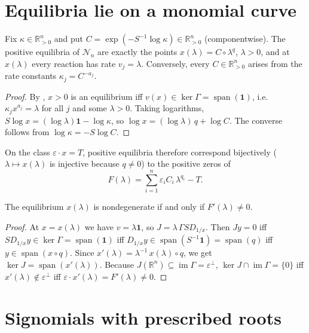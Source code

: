 \documentclass[11pt,a4paper]{report}
\newcommand{\Net}{\mathcal N}
\newcommand{\one}{\mathbf 1}
\providecommand{\im}{\operatorname{im}}
\providecommand{\spn}{\operatorname{span}}
\begin{document}
\section{Equilibria lie on a monomial curve}

\begin{lemma}\label{lem:curve}
Fix \(\kappa\in\mathbb R^n_{>0}\) and put \(C=\exp(-S^{-1}\log\kappa)\in\mathbb R^n_{>0}\) (componentwise). The positive
equilibria of \(\Net_n\) are exactly the points \(x(\lambda)=C\circ\lambda^{q}\), \(\lambda>0\), and at \(x(\lambda)\)
every reaction has rate \(v_j=\lambda\). Conversely, every \(C\in\mathbb R^n_{>0}\) arises from the rate constants
\(\kappa_j=C^{-a_j}\).
\end{lemma}

\begin{proof}
By , \(x>0\) is an equilibrium iff \(v(x)\in\ker\Gamma=\spn(\one)\), i.e.\
\(\kappa_jx^{a_j}=\lambda\) for all \(j\) and some \(\lambda>0\). Taking logarithms,
\(S\log x=(\log\lambda)\one-\log\kappa\), so \(\log x=(\log\lambda)\,q+\log C\). The converse follows from
\(\log\kappa=-S\log C\).
\end{proof}

On the class \(\varepsilon\cdot x=T\), positive equilibria therefore correspond bijectively (\(\lambda\mapsto
x(\lambda)\) is injective because \(q\ne0\)) to the positive zeros of
\[
F(\lambda)=\sum_{i=1}^n\varepsilon_iC_i\,\lambda^{q_i}-T .
\]

\begin{lemma}[note=nondegeneracy]\label{lem:nondeg}
The equilibrium \(x(\lambda)\) is nondegenerate if and only if \(F'(\lambda)\neq0\).
\end{lemma}

\begin{proof}
At \(x=x(\lambda)\) we have \(v=\lambda\one\), so \(J=\lambda\,\Gamma SD_{1/x}\). Then \(Jy=0\) iff
\(SD_{1/x}y\in\ker\Gamma=\spn(\one)\) iff \(D_{1/x}y\in\spn(S^{-1}\one)=\spn(q)\) iff \(y\in\spn(x\circ q)\).
Since \(x'(\lambda)=\lambda^{-1}\,x(\lambda)\circ q\), we get \(\ker J=\spn(x'(\lambda))\). Because
\(J(\mathbb R^n)\subseteq\im\Gamma=\varepsilon^\perp\), \(\ker J\cap\im\Gamma=\{0\}\) iff
\(x'(\lambda)\notin\varepsilon^\perp\) iff \(\varepsilon\cdot x'(\lambda)=F'(\lambda)\neq0\).
\end{proof}

\section{Signomials with prescribed roots}
\end{document}
